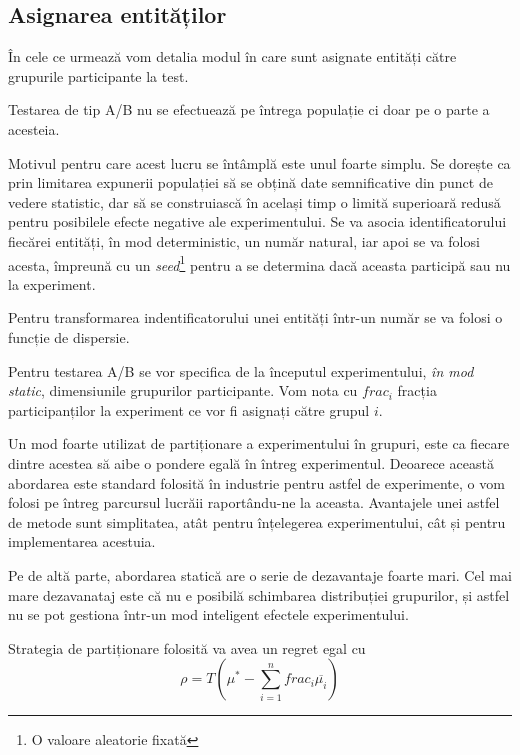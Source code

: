 \subsection{Asignarea entităților}

În cele ce urmează vom detalia modul în care sunt asignate entități către grupurile participante la test.

\begin{remark}
	Testarea de tip A/B nu se efectuează pe întrega populație ci doar pe o parte a acesteia.
\end{remark}

Motivul pentru care acest lucru se întâmplă este unul foarte simplu. Se dorește ca prin limitarea expunerii populației să se obțină date semnificative din punct de vedere statistic, dar să se construiască în același timp o limită superioară redusă pentru posibilele efecte negative ale experimentului. Se va asocia identificatorului fiecărei entități, în mod deterministic, un număr natural, iar apoi se va folosi acesta, împreună cu un \textit{seed}\footnote{O valoare aleatorie fixată} pentru a se determina dacă aceasta participă sau nu la experiment.

\begin{remark}
	Pentru transformarea indentificatorului unei entități într-un număr se va folosi o funcție de dispersie.
\end{remark}

Pentru testarea A/B se vor specifica de la începutul experimentului, \textit{în mod static}, dimensiunile grupurilor participante. Vom nota cu $frac_{i}$ fracția participanților la experiment ce vor fi asignați către grupul $i$.

 Un mod foarte utilizat de partiționare a experimentului în grupuri, este ca fiecare dintre acestea să aibe o pondere egală în întreg experimentul. Deoarece această abordarea este standard folosită în industrie pentru astfel de experimente, o vom folosi pe întreg parcursul lucrăii raportându-ne la aceasta. Avantajele unei astfel de metode sunt simplitatea, atât pentru înțelegerea experimentului, cât și pentru implementarea acestuia.

Pe de altă parte, abordarea statică are o serie de dezavantaje foarte mari. Cel mai mare dezavanataj este că nu e posibilă schimbarea distribuției grupurilor, și astfel nu se pot gestiona într-un mod inteligent efectele experimentului. 

\begin{remark}
	Strategia de partiționare folosită va avea un regret egal cu
	\[
	\rho = T ( \mu^*  - \sum_{i = 1}^{n} frac_{i} \overline{\mu_i})
	\]
\end{remark}

